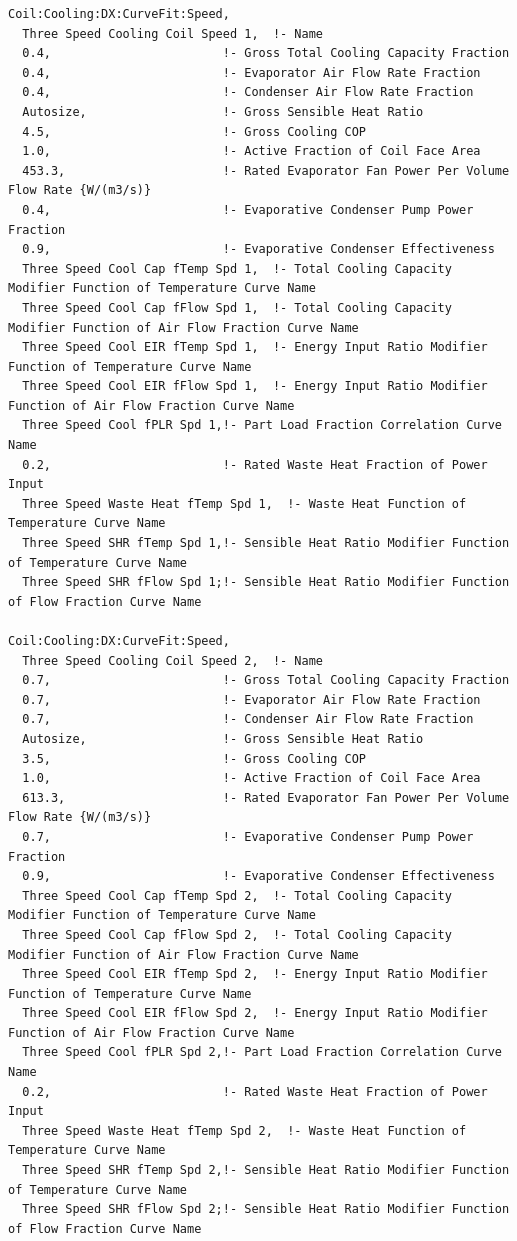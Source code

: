 \begin{lstlisting}
Coil:Cooling:DX:CurveFit:Speed,
  Three Speed Cooling Coil Speed 1,  !- Name
  0.4,                        !- Gross Total Cooling Capacity Fraction
  0.4,                        !- Evaporator Air Flow Rate Fraction
  0.4,                        !- Condenser Air Flow Rate Fraction
  Autosize,                   !- Gross Sensible Heat Ratio
  4.5,                        !- Gross Cooling COP
  1.0,                        !- Active Fraction of Coil Face Area
  453.3,                      !- Rated Evaporator Fan Power Per Volume Flow Rate {W/(m3/s)}
  0.4,                        !- Evaporative Condenser Pump Power Fraction
  0.9,                        !- Evaporative Condenser Effectiveness
  Three Speed Cool Cap fTemp Spd 1,  !- Total Cooling Capacity Modifier Function of Temperature Curve Name
  Three Speed Cool Cap fFlow Spd 1,  !- Total Cooling Capacity Modifier Function of Air Flow Fraction Curve Name
  Three Speed Cool EIR fTemp Spd 1,  !- Energy Input Ratio Modifier Function of Temperature Curve Name
  Three Speed Cool EIR fFlow Spd 1,  !- Energy Input Ratio Modifier Function of Air Flow Fraction Curve Name
  Three Speed Cool fPLR Spd 1,!- Part Load Fraction Correlation Curve Name
  0.2,                        !- Rated Waste Heat Fraction of Power Input
  Three Speed Waste Heat fTemp Spd 1,  !- Waste Heat Function of Temperature Curve Name
  Three Speed SHR fTemp Spd 1,!- Sensible Heat Ratio Modifier Function of Temperature Curve Name
  Three Speed SHR fFlow Spd 1;!- Sensible Heat Ratio Modifier Function of Flow Fraction Curve Name

Coil:Cooling:DX:CurveFit:Speed,
  Three Speed Cooling Coil Speed 2,  !- Name
  0.7,                        !- Gross Total Cooling Capacity Fraction
  0.7,                        !- Evaporator Air Flow Rate Fraction
  0.7,                        !- Condenser Air Flow Rate Fraction
  Autosize,                   !- Gross Sensible Heat Ratio
  3.5,                        !- Gross Cooling COP
  1.0,                        !- Active Fraction of Coil Face Area
  613.3,                      !- Rated Evaporator Fan Power Per Volume Flow Rate {W/(m3/s)}
  0.7,                        !- Evaporative Condenser Pump Power Fraction
  0.9,                        !- Evaporative Condenser Effectiveness
  Three Speed Cool Cap fTemp Spd 2,  !- Total Cooling Capacity Modifier Function of Temperature Curve Name
  Three Speed Cool Cap fFlow Spd 2,  !- Total Cooling Capacity Modifier Function of Air Flow Fraction Curve Name
  Three Speed Cool EIR fTemp Spd 2,  !- Energy Input Ratio Modifier Function of Temperature Curve Name
  Three Speed Cool EIR fFlow Spd 2,  !- Energy Input Ratio Modifier Function of Air Flow Fraction Curve Name
  Three Speed Cool fPLR Spd 2,!- Part Load Fraction Correlation Curve Name
  0.2,                        !- Rated Waste Heat Fraction of Power Input
  Three Speed Waste Heat fTemp Spd 2,  !- Waste Heat Function of Temperature Curve Name
  Three Speed SHR fTemp Spd 2,!- Sensible Heat Ratio Modifier Function of Temperature Curve Name
  Three Speed SHR fFlow Spd 2;!- Sensible Heat Ratio Modifier Function of Flow Fraction Curve Name


\end{lstlisting}
